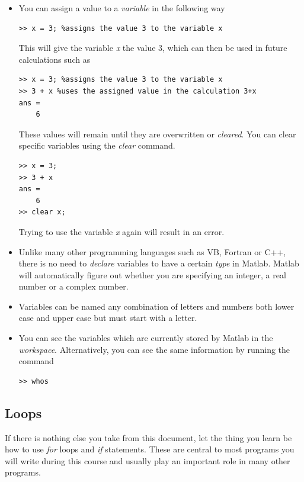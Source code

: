 \documentclass[12pt]{report}
\begin{document}
\begin{itemize}
\item You can assign a value to a \textit{variable} in the following way
%
\begin{lstlisting}
>> x = 3; %assigns the value 3 to the variable x
\end{lstlisting}
%
This will give the variable \textit{x} the value 3, which can then be used in future calculations such as
%
\begin{lstlisting}
>> x = 3; %assigns the value 3 to the variable x
>> 3 + x %uses the assigned value in the calculation 3+x 
ans =
	6
\end{lstlisting}
%
These values will remain until they are overwritten or \textit{cleared}. You can clear specific variables using the \textit{clear} command.
%
\begin{lstlisting}
>> x = 3;
>> 3 + x
ans =
	6
>> clear x;
\end{lstlisting}
%
Trying to use the variable \textit{x} again will result in an error.

\item Unlike many other programming languages such as VB, Fortran or C++, there is no need to \textit{declare} variables to have a certain \textit{type} in Matlab. Matlab will automatically figure out whether you are specifying an integer, a real number or a complex number. 

\item Variables can be named any combination of letters and numbers both lower case and upper case but must start with a letter. 

\item You can see the variables which are currently stored by Matlab in the \textit{workspace}. Alternatively, you can see the same information by running the command
%
\begin{lstlisting}
>> whos
\end{lstlisting}
%
\end{itemize}

\subsection*{Loops}

If there is nothing else you take from this document, let the thing you learn be how to use \textit{for} loops and \textit{if} statements. These are central to most programs you will write during this course and usually play an important role in many other programs.
\end{document}
